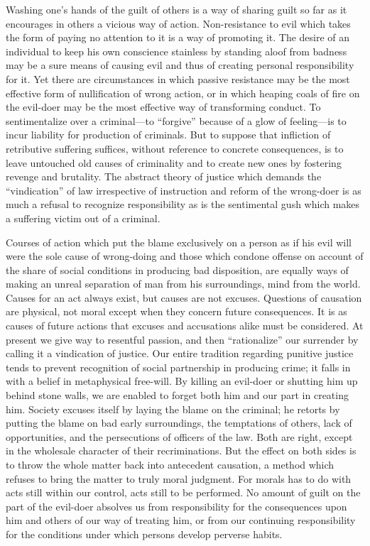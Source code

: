 \documentclass[12pt]{article}
\begin{document}
Washing one's hands of the guilt of others is a way
of sharing guilt so far as it encourages in others a
vicious way of action. Non-resistance to evil which
takes the form of paying no attention to it is a way
of promoting it. The desire of an individual to keep
his own conscience stainless by standing aloof from
badness may be a sure means of causing evil and thus
of creating personal responsibility for it. Yet there are
circumstances in which passive resistance may be the
most effective form of nullification of wrong action,
or in which heaping coals of fire on the evil-doer may
be the most effective way of transforming conduct. To
sentimentalize over a criminal---to ``forgive'' because
of a glow of feeling---is to incur liability for production
of criminals. But to suppose that infliction of retributive
suffering suffices, without reference to concrete
consequences, is to leave untouched old causes of criminality
and to create new ones by fostering revenge and
brutality. The abstract theory of justice which demands
the ``vindication'' of law irrespective of instruction
and reform of the wrong-doer is as much a
refusal to recognize responsibility as is the sentimental
gush which makes a suffering victim out of a criminal.

Courses of action which put the blame exclusively
on a person as if his evil will were the sole cause of
wrong-doing and those which condone offense on account
of the share of social conditions in producing
bad disposition, are equally ways of making an unreal
separation of man from his surroundings, mind from
the world. Causes for an act always exist, but causes
are not excuses. Questions of causation are physical,
not moral except when they concern future consequences.
It is as causes of future actions that excuses
and accusations alike must be considered. At present
we give way to resentful passion, and then ``rationalize''
our surrender by calling it a vindication of justice.
Our entire tradition regarding punitive justice tends
to prevent recognition of social partnership in producing
crime; it falls in with a belief in metaphysical
free-will. By killing an evil-doer or shutting him up
behind stone walls, we are enabled to forget both him
and our part in creating him. Society excuses itself
by laying the blame on the criminal; he retorts by putting
the blame on bad early surroundings, the temptations
of others, lack of opportunities, and the persecutions
of officers of the law. Both are right, except in
the wholesale character of their recriminations. But
the effect on both sides is to throw the whole matter
back into antecedent causation, a method which refuses
to bring the matter to truly moral judgment. For
morals has to do with acts still within our control, acts
still to be performed. No amount of guilt on the part
of the evil-doer absolves us from responsibility for the
consequences upon him and others of our way of treating
him, or from our continuing responsibility for the
conditions under which persons develop perverse habits.
\end{document}
